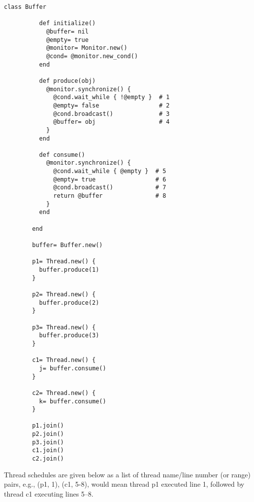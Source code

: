 \documentclass[11pt]{article}
\begin{document}
\begin{enumerate}
          \vspace{-.5mm}

          \setlength{\columnseprule}{.15mm}

          \begin{multicols}{2}

            \enlargethispage{10mm}

            \begin{Verbatim}[baselinestretch=.9]
        class Buffer
        
          def initialize()
            @buffer= nil
            @empty= true
            @monitor= Monitor.new()
            @cond= @monitor.new_cond()
          end
        
          def produce(obj)
            @monitor.synchronize() {
              @cond.wait_while { !@empty }  # 1
              @empty= false                 # 2
              @cond.broadcast()             # 3
              @buffer= obj                  # 4
            }
          end
        
          def consume()
            @monitor.synchronize() {
              @cond.wait_while { @empty }  # 5
              @empty= true                 # 6
              @cond.broadcast()            # 7
              return @buffer               # 8
            }
          end
        
        end
        
        buffer= Buffer.new()
        
        p1= Thread.new() {
          buffer.produce(1)
        }
        
        p2= Thread.new() {
          buffer.produce(2)
        }
        
        p3= Thread.new() {
          buffer.produce(3)
        }
        
        c1= Thread.new() {
          j= buffer.consume()
        }
        
        c2= Thread.new() {
          k= buffer.consume()
        }
        
        p1.join()
        p2.join()
        p3.join()
        c1.join()
        c2.join()
            \end{Verbatim}

            \columnbreak

            Thread schedules are given below as a list of thread name/line
            number (or range) pairs, e.g., (p1, 1), (c1, 5-8), would mean
            thread p1 executed line 1, followed by thread c1 executing lines
            5--8.


\end{multicols}
\end{enumerate}
\end{document}
